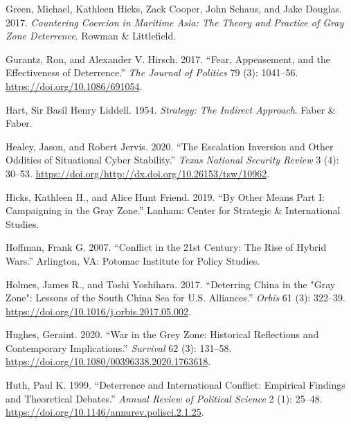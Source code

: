 \documentclass[
]{article}
\begin{document}
\leavevmode\hypertarget{ref-green_counteringcoercionmaritime_2017}{}%
Green, Michael, Kathleen Hicks, Zack Cooper, John Schaus, and Jake Douglas. 2017. \emph{Countering Coercion in Maritime Asia: The Theory and Practice of Gray Zone Deterrence}. Rowman \& Littlefield.

\leavevmode\hypertarget{ref-gurantz_fearappeasementeffectiveness_2017}{}%
Gurantz, Ron, and Alexander V. Hirsch. 2017. ``Fear, Appeasement, and the Effectiveness of Deterrence.'' \emph{The Journal of Politics} 79 (3): 1041--56. \url{https://doi.org/10.1086/691054}.

\leavevmode\hypertarget{ref-hart_strategyindirectapproach_1954}{}%
Hart, Sir Basil Henry Liddell. 1954. \emph{Strategy: The Indirect Approach}. Faber \& Faber.

\leavevmode\hypertarget{ref-healey_escalationinversionother_2020}{}%
Healey, Jason, and Robert Jervis. 2020. ``The Escalation Inversion and Other Oddities of Situational Cyber Stability.'' \emph{Texas National Security Review} 3 (4): 30--53. \url{https://doi.org/http://dx.doi.org/10.26153/tsw/10962}.

\leavevmode\hypertarget{ref-hicks_othermeanspart_2019}{}%
Hicks, Kathleen H., and Alice Hunt Friend. 2019. ``By Other Means Part I: Campaigning in the Gray Zone.'' Lanham: Center for Strategic \& International Studies.

\leavevmode\hypertarget{ref-hoffman_conflict21stcentury_2007}{}%
Hoffman, Frank G. 2007. ``Conflict in the 21st Century: The Rise of Hybrid Wars.'' Arlington, VA: Potomac Institute for Policy Studies.

\leavevmode\hypertarget{ref-holmes_deterringchinagray_2017}{}%
Holmes, James R., and Toshi Yoshihara. 2017. ``Deterring China in the "Gray Zone": Lessons of the South China Sea for U.S. Alliances.'' \emph{Orbis} 61 (3): 322--39. \url{https://doi.org/10.1016/j.orbis.2017.05.002}.

\leavevmode\hypertarget{ref-hughes_wargreyzone_2020}{}%
Hughes, Geraint. 2020. ``War in the Grey Zone: Historical Reflections and Contemporary Implications.'' \emph{Survival} 62 (3): 131--58. \url{https://doi.org/10.1080/00396338.2020.1763618}.

\leavevmode\hypertarget{ref-huth_deterrenceinternationalconflict_1999}{}%
Huth, Paul K. 1999. ``Deterrence and International Conflict: Empirical Findings and Theoretical Debates.'' \emph{Annual Review of Political Science} 2 (1): 25--48. \url{https://doi.org/10.1146/annurev.polisci.2.1.25}.
\end{document}
